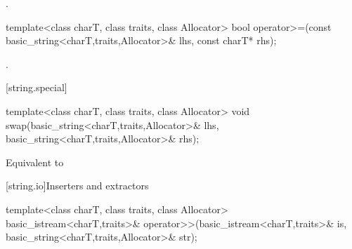 \begin{itemdescr}
\pnum
\returns
{}.
\end{itemdescr}

%
%
\begin{itemdecl}
template<class charT, class traits, class Allocator>
  bool operator>=(const basic_string<charT,traits,Allocator>& lhs,
                  const charT* rhs);
\end{itemdecl}

\begin{itemdescr}
\pnum
\returns
{}.
\end{itemdescr}

[string.special]{}

%
%
\begin{itemdecl}
template<class charT, class traits, class Allocator>
  void swap(basic_string<charT,traits,Allocator>& lhs,
    basic_string<charT,traits,Allocator>& rhs);
\end{itemdecl}

\begin{itemdescr}
\pnum
\effects
Equivalent to 
\end{itemdescr}

[string.io]{Inserters and extractors}

%
%
\begin{itemdecl}
template<class charT, class traits, class Allocator>
  basic_istream<charT,traits>&
    operator>>(basic_istream<charT,traits>& is,
               basic_string<charT,traits,Allocator>& str);
\end{itemdecl}

